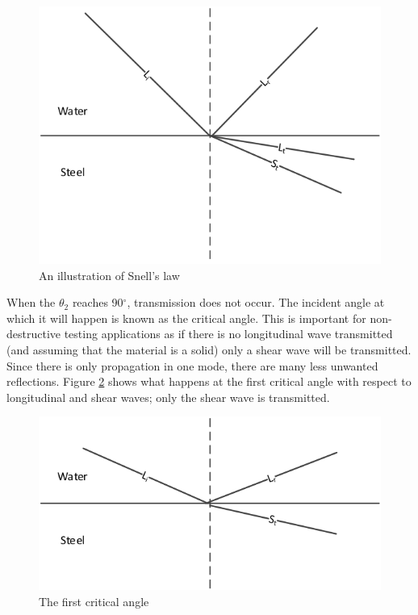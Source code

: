 \begin{figure}[!ht]
\centering
		\includegraphics[width=13cm]{SnellsLaw2.png}
		\caption{An illustration of Snell's law}
		\label{fig:review_snell}
\end{figure}

When the $\theta_{2}$ reaches 90$^{\circ}$, transmission does not occur. The incident angle at which it will happen is known as the critical angle. This is important for non-destructive testing applications as if there is no longitudinal wave transmitted (and assuming that the material is a solid) only a shear wave will be transmitted. Since there is only propagation in one mode, there are many less unwanted reflections. Figure \ref{fig:review_critang1} shows what happens at the first critical angle with respect to longitudinal and shear waves; only the shear wave is transmitted.

\begin{figure}[!ht]
\centering
		\includegraphics[width=13cm]{CritAngle12.png}
		\caption{The first critical angle}
		\label{fig:review_critang1}
\end{figure}

